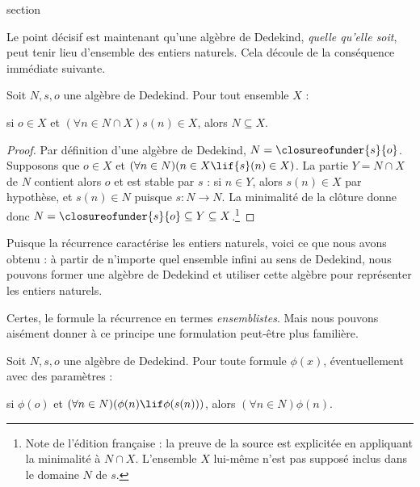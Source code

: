 \documentclass[11pt,a4paper,openany]{memoir}
\begin{document}
\endgroup


\begingroup
\expandafter\def\csname ol@sectioncs\endcsname{section}
\def\olfilename{dedekind-induction}



Le point décisif est maintenant qu'une algèbre de Dedekind,
\emph{quelle qu'elle soit}, peut tenir lieu d'ensemble des entiers
naturels. Cela découle de la conséquence immédiate suivante.

\begin{thm}
Soit $N,s,o$ une algèbre de Dedekind. Pour tout ensemble $X$ :
	\begin{center}
		si $o \in X$ et $(\forall {n} \in N \cap X){s}({n}) \in X$,
		alors $N \subseteq X$.
	\end{center}
\end{thm}

\begin{proof}
Par définition d'une algèbre de Dedekind,
$N = \closureofunder{s}{o}$. Supposons que $o \in X$ et
$(\forall {n} \in N)(n \in X \lif {s}({n}) \in X)$.
La partie $Y=N\cap X$ de $N$ contient alors $o$ et est stable par $s$ :
si $n\in Y$, alors $s(n)\in X$ par hypothèse, et $s(n)\in N$
puisque $s\colon N\to N$. La minimalité de la clôture donne donc
$N=\closureofunder{s}{o}\subseteq Y\subseteq X$.\footnote{Note de
l'édition française : la preuve de la source est explicitée en appliquant
la minimalité à $N\cap X$. L'ensemble $X$ lui-même n'est pas supposé
inclus dans le domaine $N$ de $s$.}
\end{proof}

Puisque la récurrence caractérise les entiers naturels, voici ce que
nous avons obtenu : à partir de n'importe quel ensemble infini au sens
de Dedekind, nous pouvons former une algèbre de Dedekind et utiliser
cette algèbre pour représenter les entiers naturels.

Certes, le  formule la récurrence
en termes \emph{ensemblistes}. Mais nous pouvons aisément donner à ce
principe une formulation peut-être plus familière.

\begin{cor}
Soit $N,s,o$ une algèbre de Dedekind. Pour toute formule $\phi(x)$,
éventuellement avec des paramètres :
\begin{center}
	si $\phi(o)$ et $(\forall {n} \in N)(\phi(n)\lif
	\phi({s}({n})))$, alors $(\forall n \in N)\phi(n)$.
\end{center}
\end{cor}
\end{document}
